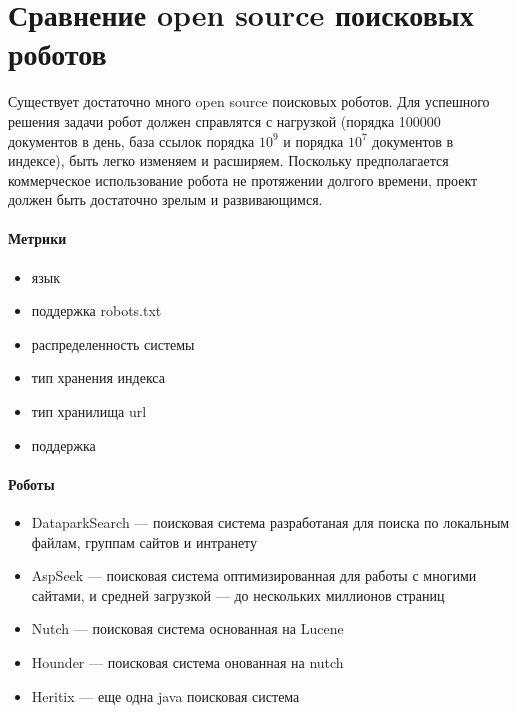 \section{Сравнение open source поисковых роботов}
Существует достаточно много open source поисковых роботов. Для успешного решения задачи робот должен справлятся с нагрузкой (порядка 100000 документов в день, база ссылок порядка $10^{9}$ и порядка $10^7$ документов в индексе), быть легко изменяем и расширяем. Поскольку предполагается коммерческое использование робота не протяжении долгого времени, проект должен быть достаточно зрелым и развивающимся.
\paragraph{Метрики}
\begin{itemize}
 \item язык
 \item поддержка robots.txt
 \item распределенность системы
 \item тип хранения индекса
 \item тип хранилища url
 \item поддержка
\end{itemize}
\paragraph{Роботы}
\begin{itemize}
 \item DataparkSearch --- поисковая система разработаная для поиска по локальным файлам, группам сайтов и интранету
 \item AspSeek --- поисковая система оптимизированная для работы с многими сайтами, и средней загрузкой --- до нескольких миллионов страниц
 \item Nutch --- поисковая система основанная на Lucene
 \item Hounder --- поисковая система онованная на nutch
 \item Heritix --- еще одна java поисковая система
\end{itemize}
